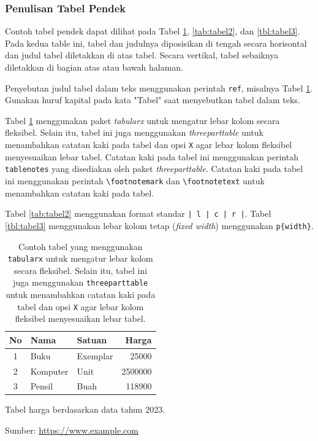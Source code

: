 \subsubsection{Penulisan Tabel Pendek}
Contoh tabel pendek dapat dilihat pada Tabel \ref{tab:tabel1}, \ref{tab:tabel2}, dan \ref{tbl:tabel3}. 
Pada kedua table ini, tabel dan judulnya diposisikan di tengah secara horisontal dan 
judul tabel diletakkan di atas tabel. Secara vertikal, tabel sebaiknya diletakkan di bagian atas atau bawah halaman.

Penyebutan judul tabel dalam teks menggunakan perintah \texttt{ref}, misalnya Tabel \ref{tab:tabel1}.
Gunakan huruf kapital pada kata "Tabel" saat menyebutkan tabel dalam teks.

Tabel \ref{tab:tabel1} menggunakan paket \textit{tabularx} untuk mengatur lebar kolom secara fleksibel. 
Selain itu, tabel ini juga menggunakan \textit{threeparttable} untuk menambahkan catatan kaki pada tabel 
dan opsi \texttt{X} agar lebar kolom fleksibel menyesuaikan lebar tabel.
Catatan kaki pada tabel ini menggunakan perintah \texttt{tablenotes} yang disediakan oleh paket \textit{threeparttable}.
Catatan kaki pada tabel ini menggunakan perintah \texttt{\textbackslash footnotemark} dan \texttt{\textbackslash footnotetext} untuk menambahkan catatan kaki pada tabel.

Tabel \ref{tab:tabel2} menggunakan format standar \texttt{| l | c | r |}. 
Tabel \ref{tbl:tabel3} menggunakan lebar kolom tetap (\textit{fixed width}) menggunakan \texttt{p\{width\}}.

\begin{table} 
  \centering
    \begin{threeparttable}[t] %
    \caption{Contoh tabel yang menggunakan \texttt{tabularx} untuk mengatur lebar kolom secara fleksibel. 
    Selain itu, tabel ini juga menggunakan \texttt{threeparttable} untuk menambahkan catatan kaki pada tabel 
    dan opsi \texttt{X} agar lebar kolom fleksibel menyesuaikan lebar tabel.}
    \label{tab:tabel1}
    \begin{tabularx}{0.6\textwidth}{| c | X| l | r @{}|} %
	    \hline
	    No & Nama 	& Satuan 		& Harga \\
	    \hline
	    1 & Buku 	& Exemplar	& 25000 \\
	    2 & Komputer	& Unit		& 2500000 \\
	    3 & Pensil	& Buah		& 118900 \\
	    \hline
	  \end{tabularx} 
    \begin{tablenotes}
      \footnotesize
      \item \footnotemark[1]Tabel harga berdasarkan data tahun 2023.
      \item \footnotemark[2]Sumber: \url{https://www.example.com}
    \end{tablenotes}
  \end{threeparttable}
\end{table}




